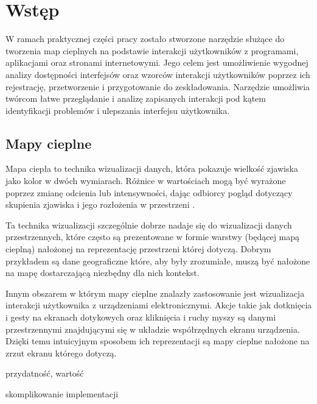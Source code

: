 \section{Wstęp}
W ramach praktycznej części pracy zostało stworzone narzędzie służące do tworzenia map cieplnych na podstawie interakcji użytkowników z programami, aplikacjami oraz stronami internetowymi. Jego celem jest umożliwienie wygodnej analizy dostępności interfejsów oraz wzorców interakcji użytkowników poprzez ich rejestrację, przetworzenie i przygotowanie do zeskładowania. Narzędzie umożliwia twórcom łatwe przeglądanie i analizę zapisanych interakcji pod kątem identyfikacji problemów i ulepszania interfejsu użytkownika.

\subsection{Mapy cieplne}
Mapa ciepła to technika wizualizacji danych, która pokazuje wielkość zjawiska jako kolor w dwóch wymiarach. Różnice w wartościach mogą być wyrażone poprzez zmianę odcienia lub intensywności, dając odbiorcy pogląd dotyczący skupienia zjawiska i jego rozłożenia w przestrzeni \cite{Heat_map_definition}.

Ta technika wizualizacji szczególnie dobrze nadaje się do wizualizacji danych przestrzennych, które często są prezentowane w formie warstwy (będącej mapą cieplną) nałożonej na reprezentację przestrzeni której dotyczą. Dobrym przykładem są dane geograficzne które, aby były zrozumiałe, muszą być nałożone na mapę dostarczającą niezbędny dla nich kontekst.


Innym obszarem w którym mapy cieplne znalazły zastosowanie jest wizualizacja interakcji użytkownika z urządzeniami elektronicznymi. Akcje takie jak dotknięcia i gesty na ekranach dotykowych oraz kliknięcia i ruchy myszy są danymi przestrzennymi znajdującymi się w układzie współrzędnych ekranu urządzenia. Dzięki temu intuicyjnym  sposobem ich reprezentacji są mapy cieplne nałożone na zrzut ekranu którego dotyczą.



przydatność, wartość

skomplikowanie implementacji
